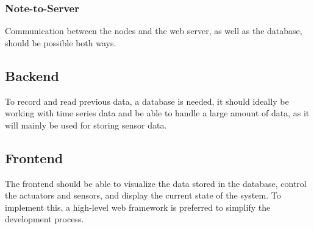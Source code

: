             \subsubsection{Note-to-Server}
            Communication between the nodes and the web server, as well as the 
            database, should be possible both ways.

        \subsection{Backend}
        To record and read previous data, a database is needed, it should ideally be 
        working with time series data and be able to handle a large amount of data, 
        as it will mainly be used for storing sensor data.

        \subsection{Frontend}
        The frontend should be able to visualize the data stored in the database,
        control the actuators and sensors, and display the current state of the 
        system. To implement this, a high-level web framework is preferred to 
        simplify the development process. 